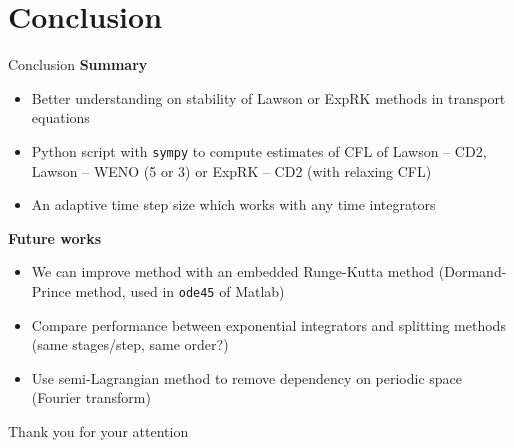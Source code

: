 \documentclass{beamer}
\newcommand{\mbold}[1]{\textbf{\color{mblue}#1}}
\newcommand{\backupbegin}{
   \newcounter{finalframe}
   \setcounter{finalframe}{\value{framenumber}}
}
\begin{document}
\section{Conclusion}

\begin{frame}{Conclusion}
  \mbold{Summary}
  \begin{itemize}
    \item Better understanding on stability of Lawson or ExpRK methods in transport equations
    \item Python script with \texttt{sympy} to compute estimates of CFL of Lawson -- CD2, Lawson -- WENO (5 or 3) or ExpRK -- CD2 (with relaxing CFL)
    \item An adaptive time step size which works with any time integrators
  \end{itemize}

  \mbold{Future works}
  \begin{itemize}
    \item We can improve method with an embedded Runge-Kutta method (Dormand-Prince method, used in \texttt{ode45} of Matlab)
    \item Compare performance between exponential integrators and splitting methods (same stages/step, same order?)
    \item Use semi-Lagrangian method to remove dependency on periodic space (Fourier transform)
  \end{itemize}
\end{frame}

\begin{frame}[t]
  \vfill
  { Thank you for your attention}
  \vfill
\end{frame}

\appendix
\backupbegin
\end{document}
